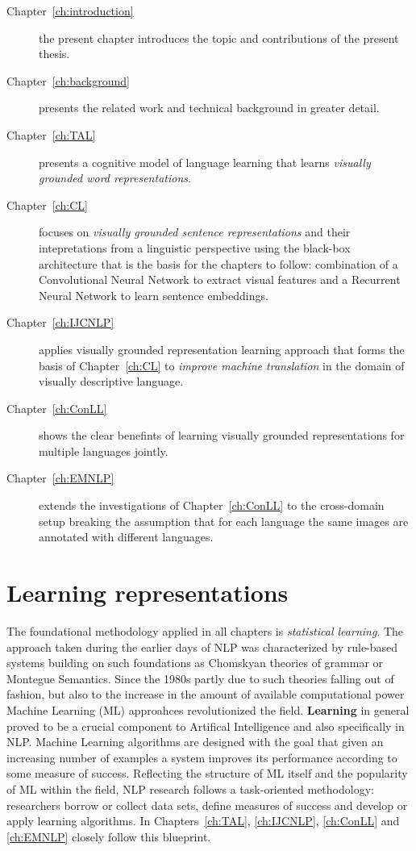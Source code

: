 \begin{description}
\item[Chapter~\ref{ch:introduction}] the present chapter introduces the topic and contributions of 
the present thesis.

\item[Chapter~\ref{ch:background}] presents the related work and technical background in greater detail. 

\item[Chapter~\ref{ch:TAL}] presents
a cognitive model of language learning that learns \emph{visually grounded word representations}.

\item[Chapter~\ref{ch:CL} ] focuses on \emph{visually grounded sentence representations} and their 
intepretations from a linguistic perspective using the black-box architecture that is the basis 
for the chapters to follow: combination of a Convolutional Neural Network to extract visual features and
a Recurrent Neural Network to learn sentence embeddings.

\item[Chapter~\ref{ch:IJCNLP}] applies visually grounded representation learning approach that forms the
basis of Chapter~\ref{ch:CL} to \emph{improve machine translation} in the domain of visually descriptive language. 

\item[Chapter~\ref{ch:ConLL}] shows the clear benefints of learning visually grounded representations
for multiple languages jointly.

\item[Chapter~\ref{ch:EMNLP}] extends the investigations of Chapter~\ref{ch:ConLL} to the 
cross-domain setup breaking the assumption that for each language the same images are annotated
with different languages.
\end{description}
 


\section{Learning representations}
The foundational methodology applied in all chapters is \emph{statistical learning}. 
The approach taken during the earlier days of NLP was characterized by rule-based systems building on such 
foundations as Chomskyan theories of grammar or Montegue Semantics. 
Since the 1980s partly due to such theories falling out of fashion, but also to the increase in the amount 
of available computational power Machine Learning (ML) approahces revolutionized
the field.  \textbf{Learning} in general proved to be a crucial component to Artifical Intelligence and also
specifically in NLP. Machine Learning algorithms are designed with the goal that given an increasing 
number of examples a system improves its performance according to some measure of success.
Reflecting the structure of ML itself and the popularity of ML within the field, NLP research follows
a task-oriented methodology: researchers borrow or collect data sets, define measures of success and develop or
apply learning algorithms. In Chapters~\ref{ch:TAL}, \ref{ch:IJCNLP}, \ref{ch:ConLL} and
\ref{ch:EMNLP}  closely follow this blueprint.

